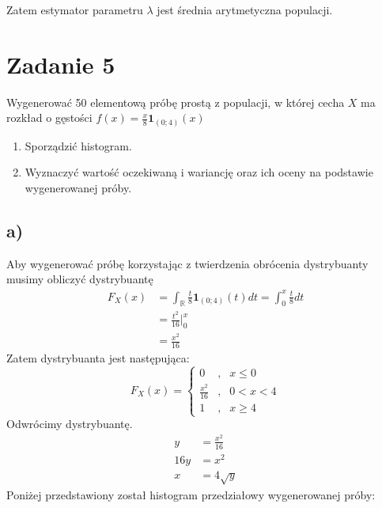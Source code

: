 \documentclass{article}
\begin{document}
Zatem estymator parametru $\lambda$ jest średnia arytmetyczna populacji.

\section{Zadanie 5}
Wygenerować 50 elementową próbę prostą z populacji, w której cecha $X$ ma rozkład o gęstości $f(x) = \frac{x}{8} \textbf{1}_{(0;4)}(x)$
\begin{enumerate}[label = \alph*)]
\item Sporządzić histogram.
\item Wyznaczyć wartość oczekiwaną i wariancję oraz ich oceny na podstawie wygenerowanej próby.
\end{enumerate}

\subsection{a)}
Aby wygenerować próbę korzystając z twierdzenia obrócenia dystrybuanty musimy obliczyć dystrybuantę
\begin{align*}
F_X(x) & = \int_\mathbb{R}  \frac{t}{8} \textbf{1}_{(0;4)}(t) dt = \int_0^x \frac{t}{8} dt \\
& = \frac{t^2}{16} \Big\vert_0^x \\
& = \frac{x^2}{16}
\end{align*}
Zatem dystrybuanta jest następująca:
\[ F_X(x) = \left\{ \begin{array}{lcc} 0 & , & x\leq 0 \\ \frac{x^2}{16} & , & 0<x<4 \\ 1 & , & x \geq 4 \end{array} \right. \]
Odwrócimy dystrybuantę.
\begin{align*}
y & = \frac{x^2}{16} \\
16y & = x^2 \\
x & = 4\sqrt{y}
\end{align*}
Poniżej przedstawiony został histogram przedziałowy wygenerowanej próby:
\end{document}
